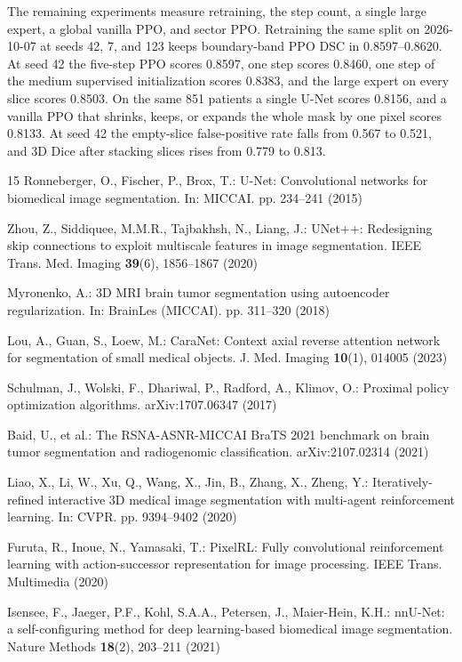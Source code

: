 \documentclass[runningheads]{llncs}
\begin{document}
The remaining experiments measure retraining, the step count, a single large expert, a global vanilla PPO, and sector PPO. Retraining the same split on 2026-10-07 at seeds 42, 7, and 123 keeps boundary-band PPO DSC in 0.8597--0.8620. At seed 42 the five-step PPO scores 0.8597, one step scores 0.8460, one step of the medium supervised initialization scores 0.8383, and the large expert on every slice scores 0.8503. On the same 851 patients a single U-Net scores 0.8156, and a vanilla PPO that shrinks, keeps, or expands the whole mask by one pixel scores 0.8133. At seed 42 the empty-slice false-positive rate falls from 0.567 to 0.521, and 3D Dice after stacking slices rises from 0.779 to 0.813.

\begin{thebibliography}{15}
Ronneberger, O., Fischer, P., Brox, T.: U-Net: Convolutional networks for biomedical image segmentation. In: MICCAI. pp. 234--241 (2015)

Zhou, Z., Siddiquee, M.M.R., Tajbakhsh, N., Liang, J.: UNet++: Redesigning skip connections to exploit multiscale features in image segmentation. IEEE Trans. Med. Imaging \textbf{39}(6), 1856--1867 (2020)

Myronenko, A.: 3D MRI brain tumor segmentation using autoencoder regularization. In: BrainLes (MICCAI). pp. 311--320 (2018)

Lou, A., Guan, S., Loew, M.: CaraNet: Context axial reverse attention network for segmentation of small medical objects. J. Med. Imaging \textbf{10}(1), 014005 (2023)

Schulman, J., Wolski, F., Dhariwal, P., Radford, A., Klimov, O.: Proximal policy optimization algorithms. arXiv:1707.06347 (2017)

Baid, U., et al.: The RSNA-ASNR-MICCAI BraTS 2021 benchmark on brain tumor segmentation and radiogenomic classification. arXiv:2107.02314 (2021)

Liao, X., Li, W., Xu, Q., Wang, X., Jin, B., Zhang, X., Zheng, Y.: Iteratively-refined interactive 3D medical image segmentation with multi-agent reinforcement learning. In: CVPR. pp. 9394--9402 (2020)

Furuta, R., Inoue, N., Yamasaki, T.: PixelRL: Fully convolutional reinforcement learning with action-successor representation for image processing. IEEE Trans. Multimedia (2020)

Isensee, F., Jaeger, P.F., Kohl, S.A.A., Petersen, J., Maier-Hein, K.H.: nnU-Net: a self-configuring method for deep learning-based biomedical image segmentation. Nature Methods \textbf{18}(2), 203--211 (2021)


\end{thebibliography}
\end{document}
